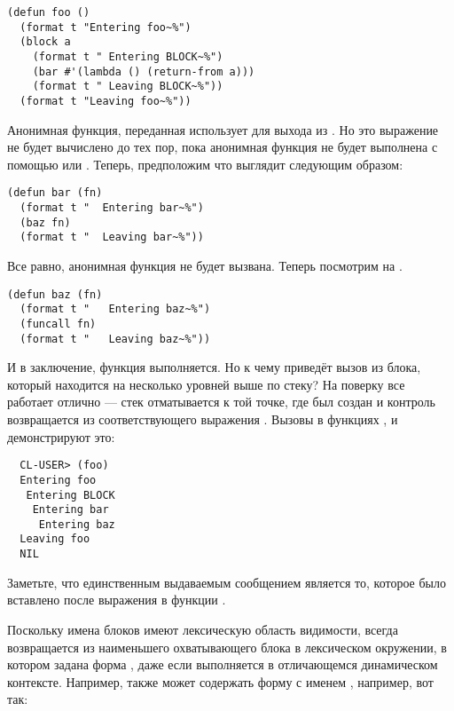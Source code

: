 \begin{lstlisting}
(defun foo ()
  (format t "Entering foo~%")
  (block a
    (format t " Entering BLOCK~%")
    (bar #'(lambda () (return-from a)))
    (format t " Leaving BLOCK~%"))
  (format t "Leaving foo~%"))
\end{lstlisting}

Анонимная функция, переданная  использует  для выхода из
. Но это выражение  не будет вычислено до тех пор, пока
анонимная функция не будет выполнена с помощью  или . Теперь,
предположим что  выглядит следующим образом:

\begin{lstlisting}
(defun bar (fn)
  (format t "  Entering bar~%")
  (baz fn)
  (format t "  Leaving bar~%"))
\end{lstlisting}

Все равно, анонимная функция не будет вызвана. Теперь посмотрим на .

\begin{lstlisting}
(defun baz (fn)
  (format t "   Entering baz~%")
  (funcall fn)
  (format t "   Leaving baz~%"))
\end{lstlisting}

И в заключение, функция выполняется. Но к чему приведёт вызов  из блока,
который находится на несколько уровней выше по стеку? На поверку все работает отлично ---
стек отматывается к той точке, где  был создан и контроль возвращается из
соответствующего выражения . Вызовы  в функциях ,
 и  демонстрируют это:

\begin{verbatim}
  CL-USER> (foo)
  Entering foo
   Entering BLOCK
    Entering bar
     Entering baz
  Leaving foo
  NIL
\end{verbatim}

Заметьте, что единственным выдаваемым сообщением  является то, которое
было вставлено после выражения  в функции .

Поскольку имена блоков имеют лексическую область видимости,  всегда
возвращается из наименьшего охватывающего блока  в лексическом окружении, в
котором задана форма , даже если  выполняется в
отличающемся динамическом контексте. Например,  также может содержать форму
 с именем , например, вот так:

